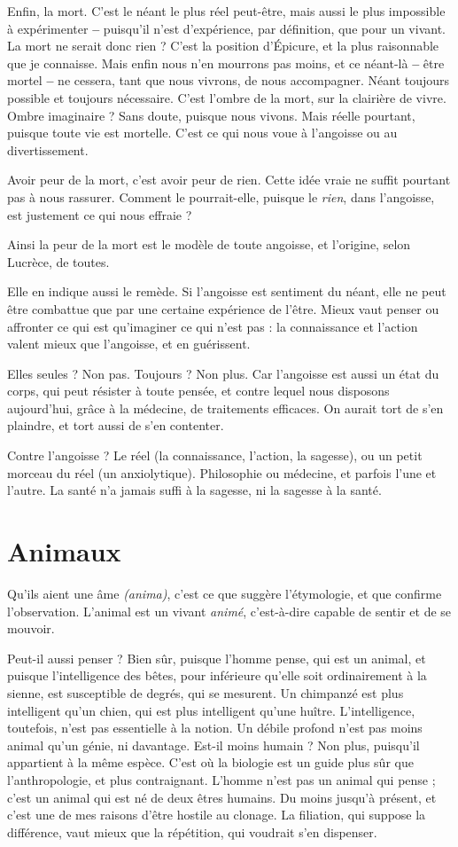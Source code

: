 Enfin, la mort. C’est le néant le plus réel peut-être, mais aussi le plus
impossible à expérimenter {\bf --} puisqu'il n’est d'expérience, par définition, que
pour un vivant. La mort ne serait donc rien ? C’est la position d’Épicure, et la
plus raisonnable que je connaisse. Mais enfin nous n’en mourrons pas moins,
et ce néant-là {\bf --} être mortel {\bf --} ne cessera, tant que nous vivrons, de nous accompagner.
Néant toujours possible et toujours nécessaire. C’est l’ombre de la
mort, sur la clairière de vivre. Ombre imaginaire ? Sans doute, puisque nous
vivons. Mais réelle pourtant, puisque toute vie est mortelle. C’est ce qui nous
voue à l’angoisse ou au divertissement.

Avoir peur de la mort, c’est avoir peur de rien. Cette idée vraie ne suffit
pourtant pas à nous rassurer. Comment le pourrait-elle, puisque le {\it rien}, dans
l'angoisse, est justement ce qui nous effraie ?

Ainsi la peur de la mort est le modèle de toute angoisse, et l’origine, selon
Lucrèce, de toutes.

Elle en indique aussi le remède. Si l'angoisse est sentiment du néant, elle ne
peut être combattue que par une certaine expérience de l'être. Mieux vaut
penser ou affronter ce qui est qu’imaginer ce qui n’est pas : la connaissance et
l’action valent mieux que l’angoisse, et en guérissent.

Elles seules ? Non pas. Toujours ? Non plus. Car l'angoisse est aussi un état
du corps, qui peut résister à toute pensée, et contre lequel nous disposons
aujourd’hui, grâce à la médecine, de traitements efficaces. On aurait tort de
s’en plaindre, et tort aussi de s’en contenter.

Contre l’angoisse ? Le réel (la connaissance, l’action, la sagesse), ou un petit
morceau du réel (un anxiolytique). Philosophie ou médecine, et parfois l’une et
l’autre. La santé n’a jamais suffi à la sagesse, ni la sagesse à la santé.

\section{Animaux}
Qu'ils aient une âme {\it (anima)}, c’est ce que suggère l’étymologie,
et que confirme l'observation. L'animal est un vivant {\it animé},
c’est-à-dire capable de sentir et de se mouvoir.

Peut-il aussi penser ? Bien sûr, puisque l’homme pense, qui est un animal,
et puisque l'intelligence des bêtes, pour inférieure qu’elle soit ordinairement à
la sienne, est susceptible de degrés, qui se mesurent. Un chimpanzé est plus
intelligent qu’un chien, qui est plus intelligent qu’une huître. L'intelligence,
toutefois, n’est pas essentielle à la notion. Un débile profond n’est pas moins
animal qu’un génie, ni davantage. Est-il moins humain ? Non plus, puisqu'il
appartient à la même espèce. C’est où la biologie est un guide plus sûr que
l'anthropologie, et plus contraignant. L'homme n’est pas un animal qui pense ;
c’est un animal qui est né de deux êtres humains. Du moins jusqu’à présent, et
c’est une de mes raisons d’être hostile au clonage. La filiation, qui suppose la
différence, vaut mieux que la répétition, qui voudrait s’en dispenser.

